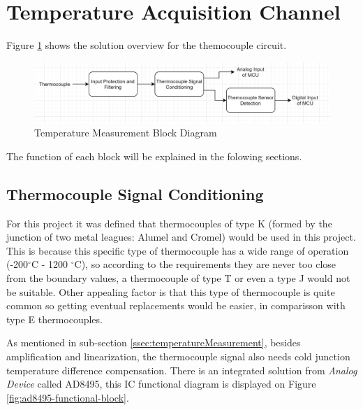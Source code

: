 \section{Temperature Acquisition Channel}\label{sec:temperatura-acquisition-channel}
	
	Figure \ref{fig:temperature-measurement-block-diagram} shows the solution overview for the themocouple circuit.

	\begin{figure}[htbp]
		\centering
		\includegraphics[width=1\textwidth]{figuras/fig-temperature-measurement-block-diagram}
		\caption{Temperature Measurement Block Diagram}
		\label{fig:temperature-measurement-block-diagram}
	\end{figure}

	The function of each block will be explained in the folowing sections.
	
	\subsection{Thermocouple Signal Conditioning}\label{ssec:thermocouple-signal-conditioning}
		
		For this project it was defined that thermocouples of type K (formed by the junction of two metal leagues: Alumel and Cromel) would be used in this project. This is because this specific type of thermocouple has a wide range of operation (-200$^{\circ}$C - 1200 $^{\circ}$C), so according to the requirements they are never too close from the boundary values, a thermocouple of type T or even a type J would not be suitable. Other appealing factor is that this type of thermocouple is quite common so getting eventual replacements would be easier, in comparisson with type E thermocouples.
		\par
		As mentioned in sub-section \ref{ssec:temperatureMeasurement}, besides amplification and linearization, the thermocouple signal also needs cold junction temperature difference compensation. There is an integrated solution from \textit{Analog Device} called AD8495, this IC functional diagram is displayed on Figure \ref{fig:ad8495-functional-block}.
		
